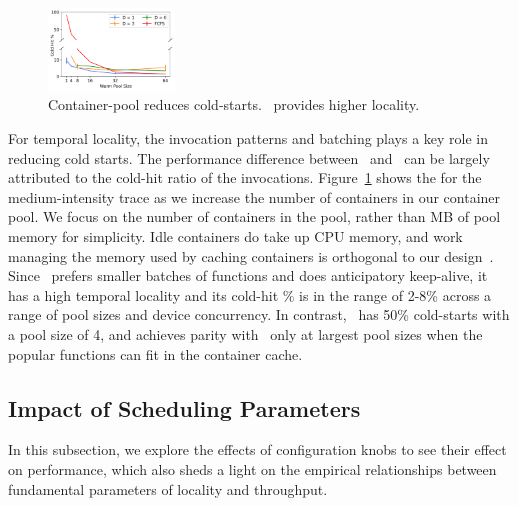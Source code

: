 \begin{figure}
  \centering  \includegraphics[width=0.30\textwidth]{../graphs/container_pool/big-60min/65/cold_hits.pdf}
  \vspace*{-8pt}
  \caption{Container-pool reduces cold-starts. \QName~provides higher locality.}
  \vspace*{-14pt}
  \label{fig:caching}
\end{figure}

For temporal locality, the invocation patterns and batching plays a key role in reducing cold starts.
The performance difference between \QName~and \fcfs~can be largely attributed to the cold-hit ratio of the invocations.
Figure~\ref{fig:caching} shows the  for the medium-intensity trace as we increase the number of containers in our container pool.
We focus on the number of containers in the pool, rather than MB of pool memory for simplicity.
Idle containers do take up CPU memory, and work managing the memory used by caching containers is orthogonal to our design~\cite{faascache-asplos21}.
Since \QName~prefers smaller batches of functions and does anticipatory keep-alive, it has a high temporal locality and its cold-hit \% is in the range of 2-8\% across a range of pool sizes and device concurrency.
In contrast, \fcfs~has 50\% cold-starts with a pool size of 4, and achieves parity with \QName~only at largest pool sizes when the popular functions can fit in the container cache.


\vspace*{\subsecspace}
\subsection{Impact of Scheduling Parameters}
\label{sec:queue-knobs}

In this subsection, we explore the effects of configuration knobs to see their effect on performance, which also sheds a light on the empirical relationships between fundamental parameters of locality and throughput. 


